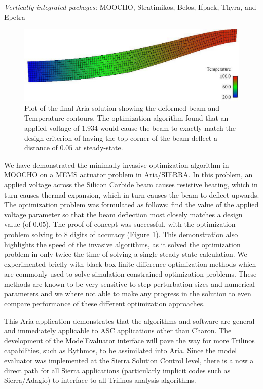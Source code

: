 \documentclass[pdf,ps2pdf,11pt]{SANDreport}
\begin{document}
{{}\noindent\textit{Vertically integrated packages:} MOOCHO, Stratimikos,
Belos, Ifpack, Thyra, and Epetra

{\bsinglespace
\begin{figure}
\begin{center}
\includegraphics*[angle=0,scale=0.50
]{SiC_dY0.1.eps}
\end{center}
\caption[Final optimization solution for Aria MEMS actuator design problem]{
\label{fig:ariaFinal}
Plot of the final Aria solution showing the deformed beam and Temperature
contours. The optimization algorithm found that an applied voltage of $1.934$
would cause the beam to exactly match the design criterion of having the top
corner of the beam deflect a distance of $0.05$ at steady-state.  }
\end{figure}
\esinglespace}

We have demonstrated the minimally invasive optimization algorithm in MOOCHO
on a MEMS actuator problem in Aria/SIERRA.  In this problem, an applied
voltage across the Silicon Carbide beam causes resistive heating, which in
turn causes thermal expansion, which in turn causes the beam to deflect
upwards. The optimization problem was formulated as follows: find the value of
the applied voltage parameter so that the beam deflection most closely matches
a design value (of $0.05$). The proof-of-concept was successful, with the
optimization problem solving to $8$ digits of accuracy (Figure
{}\ref{fig:ariaFinal}). This demonstration also highlights the speed of the
invasive algorithms, as it solved the optimization problem in only twice the
time of solving a single steady-state calculation.  We experimented briefly
with black-box finite-difference optimization methods which are commonly
used to solve simulation-constrained optimization problems.  These methods
are known to be very sensitive to step perturbation sizes and numerical
parameters and we where not able to make any progress in the solution
to even compare performance of these different optimization approaches.

This Aria application demonstrates that the algorithms and software are
general and immediately applicable to ASC applications other than Charon. The
development of the ModelEvaluator interface will pave the way for more
Trilinos capabilities, such as Rythmos, to be assimilated into Aria. Since the
model evaluator was implemented at the Sierra Solution Control level, there is
a now a direct path for all Sierra applications (particularly implicit codes
such as Sierra/Adagio) to interface to all Trilinos analysis algorithms.


}
\end{document}
